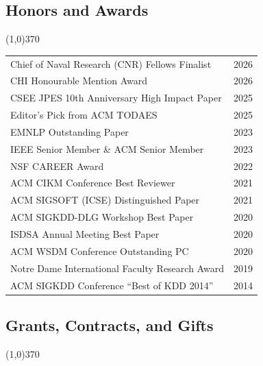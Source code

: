 \documentclass[10pt]{article}
\newcounter{list}
\begin{document}
\newpage

\subsection{\sc Honors and Awards}
\vspace{-0.4cm} \line(1,0){370} \vspace{-0.1cm}

\begin{table}[h!]
\begin{tabular*}{12.7cm}{p{11.65cm}r}
Chief of Naval Research (CNR) Fellows Finalist & 2026 \\
CHI Honourable Mention Award & 2026 \\
CSEE JPES 10th Anniversary High Impact Paper & 2025 \\
Editor's Pick from ACM TODAES & 2025 \\
EMNLP Outstanding Paper & 2023 \\
IEEE Senior Member \& ACM Senior Member & 2023 \\
NSF CAREER Award & 2022 \\
ACM CIKM Conference Best Reviewer & 2021 \\	
ACM SIGSOFT (ICSE) Distinguished Paper & 2021 \\
ACM SIGKDD-DLG Workshop Best Paper & 2020 \\
ISDSA Annual Meeting Best Paper & 2020 \\
ACM WSDM Conference Outstanding PC & 2020 \\
Notre Dame International Faculty Research Award & 2019 \\
ACM SIGKDD Conference ``Best of KDD 2014'' & 2014 \\
\end{tabular*}
\end{table}

\vspace{-0.6cm}
\subsection{\sc Grants, Contracts, and Gifts}
\vspace{-0.4cm} \line(1,0){370} \vspace{-0.1cm}
\end{document}

